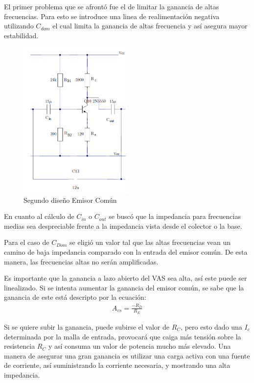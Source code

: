 El primer problema que se afrontó fue el de limitar la ganancia de altas frecuencias.
Para esto se introduce una linea de realimentación negativa utilizando $C_{dom}$ el cual limita la ganancia de altas frecuencia y así asegura mayor estabilidad.
 \begin{figure}[H]
\centering
	\includegraphics[width=0.5\textwidth]{ImagenesGain-Stage/ec2.png}
	\caption{Segundo diseño Emisor Común}
	\label{fig:ec2}
\end{figure}
En cuanto al cálculo de $C_{in}$ o $C_{out}$ se buscó que la impedancia para frecuencias medias sea despreciable frente a la impedancia vista desde el colector o la base.

Para el caso de $C_{Dom}$ se eligió un valor tal que las altas frecuencias vean un camino de baja impedancia comparado con la entrada del emisor común. De esta manera, las frecuencias altas no serán amplificadas.

Es importante que la ganancia a lazo abierto del VAS sea alta, así este puede ser linealizado. Si se intenta aumentar la ganancia del emisor común, se sabe que la ganancia de este está descripto por la ecuación:
\begin{align}
A_{vs}=\frac{-R_D}{R_E}
\end{align}

Si se quiere subir la ganancia, puede subirse el valor de $R_C$, pero esto dado una $I_c$ determinada por la  malla de entrada, provocará que caiga más tensión sobre la resistencia $R_C$ y así consuma un valor de potencia mucho más elevado. Una manera de asegurar una gran ganancia es utilizar una carga activa con una fuente de corriente, así suministrando la corriente necesaria, y mostrando una alta impedancia.

